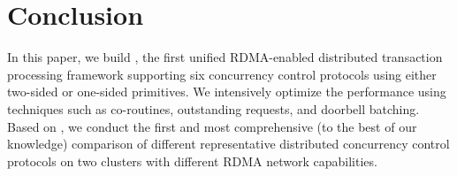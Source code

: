 \section{Conclusion}

In this paper, we build {\em \projectname}, the first
unified RDMA-enabled distributed transaction processing framework supporting 
six concurrency control protocols 
using either two-sided or one-sided primitives.
We intensively optimize the performance
using techniques such as co-routines, outstanding requests, and
doorbell batching.
Based on \projectname, we conduct the first
and most comprehensive
(to the best of our knowledge) comparison
of different representative distributed
concurrency control protocols 
on two clusters with different 
RDMA network capabilities.